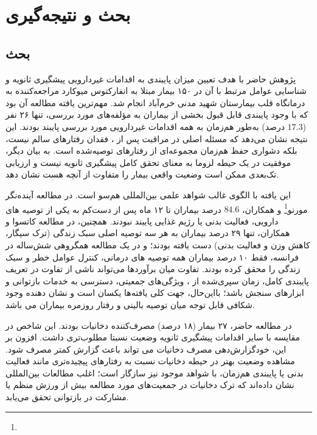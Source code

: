 \ChapterStart
\chapter{بحث و نتیجه‌گیری}
\label{ch:discussion}

\section{بحث}
\label{sec:discussion}


پژوهش حاضر با هدف تعیین میزان پایبندی به اقدامات غیردارویی پیشگیری ثانویه و شناسایی عوامل مرتبط با آن در ۱۵۰ بیمار مبتلا به انفارکتوس میوکارد مراجعه‌کننده به درمانگاه قلب بیمارستان شهید مدنی خرم‌آباد انجام شد. مهم‌ترین یافته مطالعه آن بود که با وجود پایبندی قابل قبول بخشی از بیماران به مؤلفه‌های مورد بررسی، تنها ۲۶ نفر ($17.3$ درصد) به‌طور هم‌زمان به همه اقدامات غیردارویی مورد بررسی پایبند بودند. این نتیجه نشان می‌دهد که مسئله اصلی در مراقبت پس از ، فقدان رفتارهای سالم نیست، بلکه دشواری حفظ هم‌زمان مجموعه‌ای از رفتارهای توصیه‌شده است. به بیان دیگر، موفقیت در یک حیطه لزوما به معنای تحقق کامل پیشگیری ثانویه نیست و ارزیابی تک‌بعدی ممکن است وضعیت واقعی بیمار را متفاوت از آنچه هست نشان دهد.

این یافته با الگوی غالب شواهد علمی بین‌المللی هم‌سو است. در مطالعه آینده‌نگر مورنو\footnote{} و همکاران، $84.6$ درصد بیماران تا ۱۲ ماه پس از  دست‌کم به یکی از توصیه های دارویی، فعالیت بدنی یا رژیم غذایی پایبند نبودند\cite{Moreno2024NonAdherence}. همچنین، در مطالعه کاتسوا و همکاران، تنها ۲۹ درصد بیماران به هر سه توصیه اصلی سبک زندگی (ترک سیگار، کاهش وزن و فعالیت بدنی) دست یافته بودند\cite{DeBacquer2022Lifestyle,Kotseva2019EUROASPIRE}؛ و در یک مطالعه همگروهی شش‌ساله در فرانسه، فقط ۱۰ درصد بیماران همه توصیه های درمانی، کنترل عوامل خطر و سبک زندگی را محقق کرده بودند\cite{DibaoDina2018Adherence}. تفاوت میان برآوردها می‌تواند ناشی از تفاوت در تعریف پایبندی کامل، زمان سپری‌شده از ، ویژگی‌های جمعیتی، دسترسی به خدمات بازتوانی و ابزارهای سنجش باشد؛ بااین‌حال، جهت کلی یافته‌ها یکسان است و نشان دهنده وجود شکافی قابل توجه میان توصیه بالینی و رفتار روزمره بیماران می باشد.

در مطالعه حاضر، ۲۷ بیمار (۱۸ درصد) مصرف‌کننده دخانیات بودند. این شاخص در مقایسه با سایر اقدامات پیشگیری ثانویه وضعیت نسبتا مطلوب‌تری داشت. افزون بر این، خودگزارش‌دهی مصرف دخانیات می تواند باعث گزارش کمتر مصرف شود. مشاهده وضعیت بهتر در حیطه دخانیات نسبت به رفتارهای پیچیده‌تری مانند فعالیت بدنی یا پایبندی هم‌زمان، با شواهد موجود نیز سازگار است؛ اغلب مطالعات بین‌المللی نشان داده‌اند که ترک دخانیات در جمعیت‌های مورد مطالعه بیش از ورزش منظم یا مشارکت در بازتوانی تحقق می‌یابد\cite{DeBacquer2022Lifestyle,Urbinati2015BLITZ4}.

